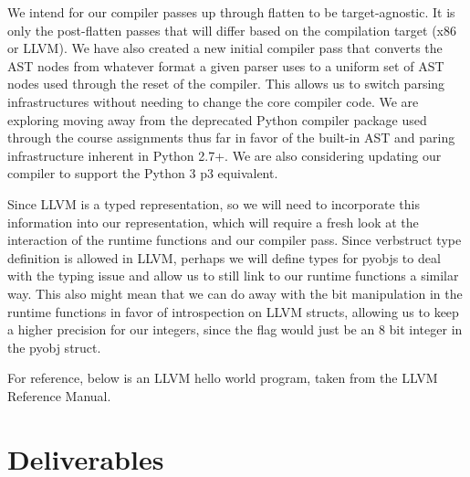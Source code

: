\documentclass[11pt]{article}
\begin{document}
We intend for our compiler passes up through flatten to be
target-agnostic. It is only the post-flatten passes that will differ
based on the compilation target (x86 or LLVM). We have also created a
new initial compiler pass that converts the AST nodes from whatever
format a given parser uses to a uniform set of AST nodes used through
the reset of the compiler. This allows us to switch parsing
infrastructures without needing to change the core compiler code. We are
exploring moving away from the deprecated Python compiler package used
through the course assignments thus far in
favor of the built-in AST and paring infrastructure inherent in Python
2.7+. We are also considering updating our compiler to support the
Python 3 p3 equivalent.

Since LLVM is a typed representation, so we will need to incorporate
this information into our representation, which will require a fresh
look at the interaction of the runtime functions and our compiler
pass. Since verb{struct} type definition is allowed in LLVM, perhaps
we will define types for pyobjs to deal with the typing issue and
allow us to still link to our runtime functions a similar way.  This
also might mean that we can do away with the bit manipulation in the
runtime functions in favor of introspection on LLVM structs, allowing
us to keep a higher precision for our integers, since the flag would
just be an 8 bit integer in the pyobj struct.

For reference, below is an LLVM hello world program, taken from the
LLVM Reference Manual.



\section{Deliverables}




\nocite{*}
\printbibliography

\end{document}

